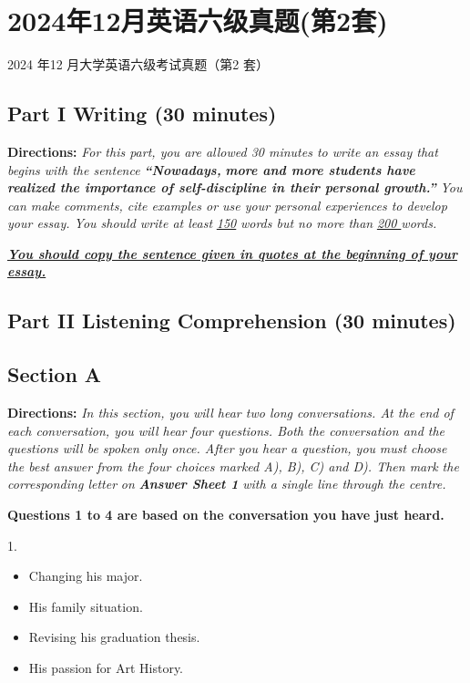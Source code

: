 \documentclass[UTF8,11pt]{ctexart}
\begin{document}
\section*{2024年12月英语六级真题(第2套)}
2024 年12 月大学英语六级考试真题（第2 套）


\subsection*{\textbf{Part I Writing} \textbf{(30 minutes)}}


\textbf{Directions:}\textit{ For this part, you are allowed 30 minutes to write an essay that begins with the sentence }\textbf{\textit{“Nowadays,}} \textbf{\textit{more and more students have realized the importance of self-discipline in their personal growth.”}}\textit{ You can make} \textit{comments, cite examples or use your personal experiences to develop your essay. You should write at least }\textit{\uline{150}} \textit{words but no more than }\textit{\uline{200 }}\textit{words.}


\textbf{\textit{\uline{You should copy the sentence given in quotes at the beginning of your essay.}}}


\subsection*{\textbf{Part II} \textbf{Listening Comprehension} \textbf{(30 minutes)}}


\subsection*{\textbf{Section A}}


\textbf{Directions:} \textit{In this section, you will hear two long conversations. At the end of each conversation, you will hear} \textit{four questions. Both the conversation and the questions will be spoken only once. After you hear a question, you} \textit{must choose the best answer from the four choices marked A), B), C) and D). Then mark the corresponding letter} \textit{on }\textbf{\textit{Answer Sheet 1}}\textit{ with a single line through the centre.}


\textbf{Questions 1 to 4 are based on the conversation you have just heard.}


1.


\begin{itemize}[leftmargin=2em,itemsep=.2em,topsep=.4em]\item[A.] Changing his major.
\item[B.] His family situation.
\item[C.] Revising his graduation thesis.
\item[D.] His passion for Art History.
\end{itemize}
\end{document}

